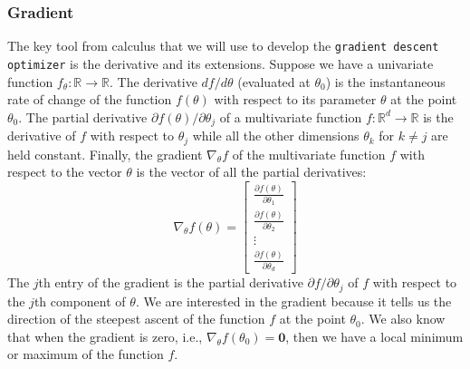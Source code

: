 \documentclass{article}[11pt]
\begin{document}
\subsubsection*{Gradient}
The key tool from calculus that we will use to develop the \texttt{gradient descent optimizer} is the derivative and its extensions. Suppose we have a univariate function $f_{\theta}: \mathbb{R} \to \mathbb{R}$. The derivative ${d f}/{d \theta}$ (evaluated at $\theta_0$) is the instantaneous rate of change of the function $f(\theta)$ with respect to its parameter $\theta$ at the point $\theta_0$. The partial derivative ${\partial f(\theta)}/{\partial \theta_j}$ of a multivariate function $f : \mathbb{R}^d \to \mathbb{R}$ is the derivative of $f$ with respect to $\theta_j$ 
while all the other dimensions $\theta_k$ for $k\neq j$ are held constant. Finally, the gradient $\nabla_{\theta} f$ of the multivariate function $f$ with respect to the vector $\theta$ is the vector of all the partial derivatives:
\begin{equation}
\nabla_{\theta} f (\theta) = \begin{bmatrix}
\frac{\partial f(\theta)}{\partial \theta_1} \\
\frac{\partial f(\theta)}{\partial \theta_2} \\
\vdots \\
\frac{\partial f(\theta)}{\partial \theta_d}
\end{bmatrix}
\end{equation}
The $j$th entry of the gradient is the partial derivative ${\partial f}/{\partial \theta_j}$ of $f$ with respect to the $j$th component of $\theta$. We are interested in the gradient because it tells us the direction of the steepest ascent of the function $f$ at the point $\theta_0$. We also know that when the gradient is zero, i.e., $\nabla_{\theta} f(\theta_0) = \mathbf{0}$, then we have a local minimum or maximum of the function $f$.
\end{document}
